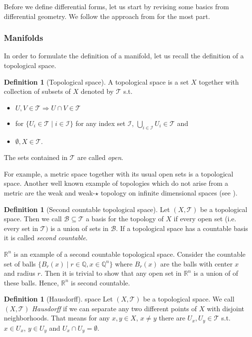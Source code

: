 \documentclass[12pt,a4paper]{article}
\numberwithin{equation}{subsection}
\numberwithin{lemma}{subsection}
\theoremstyle{definition}
\newtheorem{definition}[lemma]{Definition}
\newcommand{\rational}{\mathbb{Q}}
\newcommand{\real}{\mathbb{R}}
\begin{document}
Before we define differential forms, let us start by revising some basics
from differential geometry. We follow the approach from 
\cite[Sec. II]{topology_and_geometry} for the most part. 

\subsubsection{Manifolds}

In order to formulate the definition of a manifold, let us recall the 
definition of a topological space.
\begin{definition}[Topological space]
    A topological space is a set $X$ together with collection of subsets of 
    $X$ denoted by $\mathcal{T}$ s.t.
    \begin{itemize}
        \item $U,V \in \mathcal{T} \Rightarrow U \cap V \in \mathcal{T}$
        \item for $\{ U_i \in \mathcal{T} \mid i \in \mathcal{I} \}$
            for any index set $\mathcal{I}$, 
            $\bigcup_{i\in \mathcal{I}} U_i \in \mathcal{T}$ and
        \item $\emptyset, X \in \mathcal{T}$.
    \end{itemize}
    The sets contained in $\mathcal{T}$ are called \textit{open}.
\end{definition}
For example, a metric space together with its usual open sets is a topological
space. Another well known example of topologies which do not arise from a metric
are the weak and weak-$\star$ topology on infinite dimensional spaces
(see \cite[Ch.\,3]{brezis}).

\begin{definition}[Second countable topological space]
    Let $(X,\mathcal{T})$ be a topological space. Then we call 
    $\mathcal{B}\subseteq \mathcal{T}$ a basis for the topology of $X$ if 
    every open set (i.e. every set in $\mathcal{T})$ is a union of sets 
    in $\mathcal{B}$. If a topological space has a countable basis it is called
    \textit{second countable}.
\end{definition}
$\real^n$ is an example of a second countable topological space. Consider 
the countable set of balls $\{ B_r(x) \mid r \in \rational, x \in \rational^n\}$
where $ B_r(x)$ are the balls with center $x$ and radius $r$.
Then it is trivial to show that any open set in $\real^n$ is a union of 
of these balls. Hence, $\real^n$ is second countable.

\begin{definition}[Hausdorff] space
    Let $(X, \mathcal{T})$ be a topological space. We call $(X, \mathcal{T})$
    \textit{Hausdorff} if we can separate any two different points of $X$
    with disjoint neighborhoods. That means for any $x,y \in X$, 
    $x\neq y$ there are $U_x, U_y \in \mathcal{T}$ s.t. 
    $x \in U_x$, $y \in U_y$ and $U_x \cap U_y = \emptyset$.
\end{definition}
\end{document}
